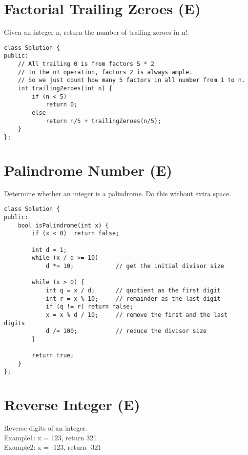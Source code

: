\section{Factorial Trailing Zeroes (E)}
Given an integer n, return the number of trailing zeroes in n!.\\

\begin{lstlisting}
class Solution {
public:
    // All trailing 0 is from factors 5 * 2
    // In the n! operation, factors 2 is always ample. 
    // So we just count how many 5 factors in all number from 1 to n.
    int trailingZeroes(int n) {
        if (n < 5)
            return 0;
        else
            return n/5 + trailingZeroes(n/5);
    }
};
\end{lstlisting}


\section{Palindrome Number (E)}
Determine whether an integer is a palindrome. Do this without extra space. \\

\begin{lstlisting}
class Solution {
public:
    bool isPalindrome(int x) {
        if (x < 0)  return false;
            
        int d = 1;      
        while (x / d >= 10) 
            d *= 10;            // get the initial divisor size
            
        while (x > 0) {
            int q = x / d;      // quotient as the first digit
            int r = x % 10;     // remainder as the last digit
            if (q != r) return false;
            x = x % d / 10;     // remove the first and the last digits
            d /= 100;           // reduce the divisor size
        }
        
        return true;
    }
};
\end{lstlisting}


\section{Reverse Integer (E)}
Reverse digits of an integer. \\

Example1: x = 123, return 321\\
Example2: x = -123, return -321\\ 

